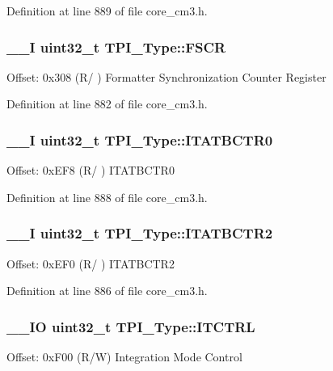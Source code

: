 Definition at line 889 of file core\-\_\-cm3.\-h.

\hypertarget{struct_t_p_i___type_a377b78fe804f327e6f8b3d0f37e7bfef}{
\subsubsection[{F\-S\-C\-R}]{\setlength{\rightskip}{0pt plus 5cm}\-\_\-\-\_\-\-I {\bf uint32\-\_\-t} T\-P\-I\-\_\-\-Type\-::\-F\-S\-C\-R}}\label{struct_t_p_i___type_a377b78fe804f327e6f8b3d0f37e7bfef}
Offset\-: 0x308 (R/ ) Formatter Synchronization Counter Register 

Definition at line 882 of file core\-\_\-cm3.\-h.

\hypertarget{struct_t_p_i___type_a20ca7fad4d4009c242f20a7b4a44b7d0}{
\subsubsection[{I\-T\-A\-T\-B\-C\-T\-R0}]{\setlength{\rightskip}{0pt plus 5cm}\-\_\-\-\_\-\-I {\bf uint32\-\_\-t} T\-P\-I\-\_\-\-Type\-::\-I\-T\-A\-T\-B\-C\-T\-R0}}\label{struct_t_p_i___type_a20ca7fad4d4009c242f20a7b4a44b7d0}
Offset\-: 0x\-E\-F8 (R/ ) I\-T\-A\-T\-B\-C\-T\-R0 

Definition at line 888 of file core\-\_\-cm3.\-h.

\hypertarget{struct_t_p_i___type_a176d991adb4c022bd5b982a9f8fa6a1d}{
\subsubsection[{I\-T\-A\-T\-B\-C\-T\-R2}]{\setlength{\rightskip}{0pt plus 5cm}\-\_\-\-\_\-\-I {\bf uint32\-\_\-t} T\-P\-I\-\_\-\-Type\-::\-I\-T\-A\-T\-B\-C\-T\-R2}}\label{struct_t_p_i___type_a176d991adb4c022bd5b982a9f8fa6a1d}
Offset\-: 0x\-E\-F0 (R/ ) I\-T\-A\-T\-B\-C\-T\-R2 

Definition at line 886 of file core\-\_\-cm3.\-h.

\hypertarget{struct_t_p_i___type_ab49c2cb6b5fe082746a444e07548c198}{
\subsubsection[{I\-T\-C\-T\-R\-L}]{\setlength{\rightskip}{0pt plus 5cm}\-\_\-\-\_\-\-I\-O {\bf uint32\-\_\-t} T\-P\-I\-\_\-\-Type\-::\-I\-T\-C\-T\-R\-L}}\label{struct_t_p_i___type_ab49c2cb6b5fe082746a444e07548c198}
Offset\-: 0x\-F00 (R/\-W) Integration Mode Control 

